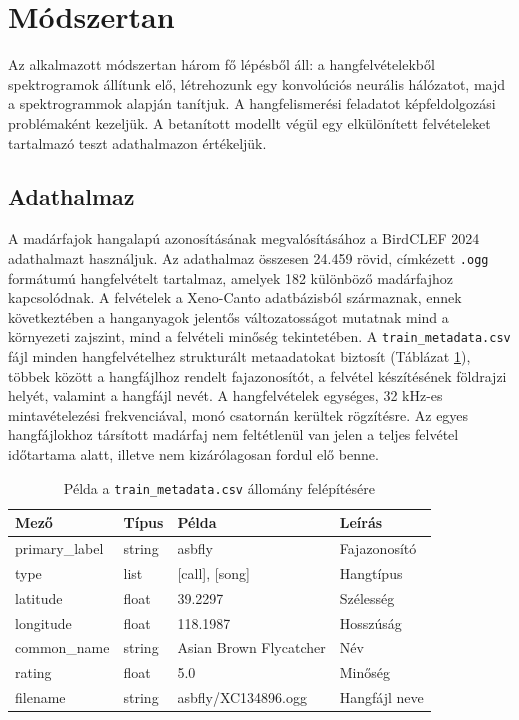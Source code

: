 \documentclass[journal]{IEEEtran}
\begin{document}
\section{Módszertan}

  Az alkalmazott módszertan három fő lépésből áll: a hangfelvételekből spektrogramok állítunk elő, létrehozunk egy konvolúciós neurális hálózatot, majd a spektrogrammok alapján tanítjuk. A hangfelismerési feladatot képfeldolgozási problémaként kezeljük. A betanított modellt végül egy elkülönített felvételeket tartalmazó teszt adathalmazon értékeljük.

  \subsection{Adathalmaz}

    A madárfajok hangalapú azonosításának megvalósításához a BirdCLEF 2024 adathalmazt használjuk. Az adathalmaz összesen 24.459 rövid, címkézett \texttt{.ogg} formátumú hangfelvételt tartalmaz, amelyek 182 különböző madárfajhoz kapcsolódnak. A felvételek a Xeno-Canto adatbázisból származnak, ennek következtében a hanganyagok jelentős változatosságot mutatnak mind a környezeti zajszint, mind a felvételi minőség tekintetében. A \texttt{train\_metadata.csv} fájl minden hangfelvételhez strukturált metaadatokat biztosít (Táblázat \ref{tab:metadata}), többek között a hangfájlhoz rendelt fajazonosítót, a felvétel készítésének földrajzi helyét, valamint a hangfájl nevét. A hangfelvételek egységes, 32 kHz-es mintavételezési frekvenciával, monó csatornán kerültek rögzítésre. Az egyes hangfájlokhoz társított madárfaj nem feltétlenül van jelen a teljes felvétel időtartama alatt, illetve nem kizárólagosan fordul elő benne.

    \begin{table}[h]
      \centering
      \caption{Példa a \texttt{train\_metadata.csv} állomány felépítésére}
      \label{tab:metadata}
      \begin{tabular}{llll}
        \toprule
        \textbf{Mező} & \textbf{Típus} & \textbf{Példa} & \textbf{Leírás} \\
        \midrule
        primary\_label & string & asbfly & Fajazonosító \\
        type & list & [call], [song] & Hangtípus \\
        latitude & float & 39.2297 & Szélesség \\
        longitude & float & 118.1987 & Hosszúság \\
        common\_name & string & Asian Brown Flycatcher & Név \\
        rating & float & 5.0 & Minőség \\
        filename & string & asbfly/XC134896.ogg & Hangfájl neve \\
        \bottomrule
      \end{tabular}
    \end{table}
\end{document}
